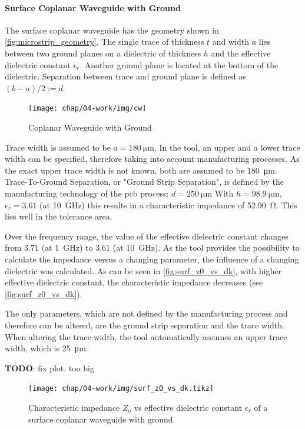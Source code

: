 \paragraph{Surface Coplanar Waveguide with Ground}
The surface coplanar waveguide has the geometry shown in \autoref{fig:microstrip_geometry}.
The single trace of thickness $t$ and width $a$ lies between two ground planes on a dielectric of thickness $h$ and the effective dielectric constant $\epsilon_r$.
Another ground plane is located at the bottom of the dielectric.
Separation between trace and ground plane is defined as $(b-a)/2 := d$. 

\begin{figure}[!htbp]
	\centering
	\texttt{[image: chap/04-work/img/cw]}
	\caption{Coplanar Waveguide with Ground}
	\label{fig:microstrip_geometry}
\end{figure}

Trace width is assumed to be $a = \SI{180}{\micro\meter}$.
In the tool, an upper and a lower trace width can be specified, therefore taking into account manufacturing processes. %
As the exact upper trace width is not known, both are assumed to be \SI{180}{\micro\meter}.
Trace-To-Ground Separation, or "Ground Strip Separation", is defined by the manufacturing technology of the \gls{pcb} process: $d = \SI{250}{\micro\meter}$
With $h = \SI{98.9}{\micro \meter}$, $\epsilon_r = 3.61$ (at \SI{10}{\GHz}) this results in a characteristic impedance of \SI{52.90}{\ohm}. This lies well in the tolerance area. %

Over the frequency range, the value of the effective dielectric constant changes from 3.71 (at \SI{1}{\GHz}) to 3.61 (at \SI{10}{\GHz}).
As the tool provides the possibility to calculate the impedance versus a changing parameter, the influence of a changing dielectric was calculated. %
As can be seen in \autoref{fig:surf_z0_vs_dk}, with higher effective dielectric constant, the characteristic impedance decreases (see \autoref{fig:surf_z0_vs_dk}).

The only parameters, which are not defined by the manufacturing process and therefore can be altered, are the ground strip separation and the trace width. %
When altering the trace width, the tool automatically assumes an upper trace width, which is \SI{25}{\micro \meter}.

\textbf{TODO}: fix plot. too big

\begin{figure}
	\centering
	\texttt{[image: chap/04-work/img/surf\_z0\_vs\_dk.tikz]}  
	\caption{Characteristic impedance $Z_o$ vs effective dielectric constant $\epsilon_r$ of a surface coplanar waveguide with ground}
	\label{fig:surf_z0_vs_dk}
\end{figure}


